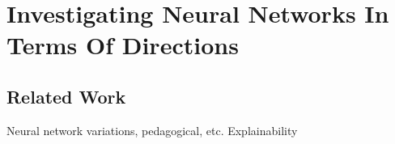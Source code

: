 \chapter{Investigating Neural Networks In Terms Of Directions}



\section{Related Work}
Neural network variations, pedagogical, etc.
Explainability